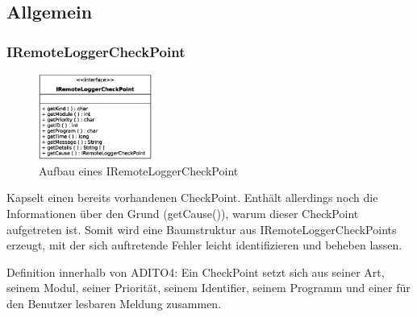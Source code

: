 \subsection{Allgemein}
\subsubsection{IRemoteLoggerCheckPoint}\label{sec:IRemoteLoggerCheckPoint}
\begin{figure} 
	\vspace{-12px}
	\centering
	\includegraphics[width=140px]{../img/CD-IRemoteLoggerCheckPoint.eps}
	\caption{Aufbau eines \glqq IRemoteLoggerCheckPoint\grqq}
\end{figure}
\par Kapselt einen bereits vorhandenen CheckPoint. Enthält allerdings noch die Informationen über den Grund (getCause()), warum dieser CheckPoint aufgetreten ist. Somit wird eine Baumstruktur aus IRemoteLoggerCheckPoints erzeugt, mit der sich auftretende Fehler leicht identifizieren und beheben lassen.
\par Definition innerhalb von ADITO4: Ein CheckPoint setzt sich aus seiner Art, seinem Modul, seiner Priorität, seinem Identifier, seinem Programm und einer für den Benutzer lesbaren Meldung zusammen.
